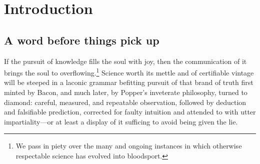 
\chapter{Introduction}
\label{chp:1}


\section{A word before things pick up}

If the pursuit of knowledge fills the soul with joy, then the
communication of it brings the soul to overflowing.\footnote{We pass
  in piety over the many and ongoing instances in which otherwise
  respectable science has evolved into bloodsport.} Science worth its
mettle and of certifiable vintage will be steeped in a laconic grammar
befitting pursuit of that brand of truth first minted by Bacon, and
much later, by Popper's inveterate philosophy, turned to diamond:
careful, measured, and repeatable observation, followed by deduction
and falsifiable prediction, corrected for faulty intuition and
attended to with utter impartiality---or at least a display of it
sufficing to avoid being given the lie.

